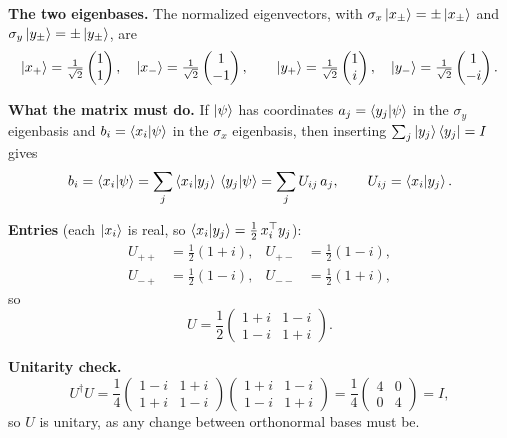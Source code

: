 \documentclass[a4paper, 10pt]{article}
\begin{document}
\begin{solution}
	\noindent \textbf{The two eigenbases.} The normalized eigenvectors, with \( \sigma_x\ket{x_\pm} = \pm\ket{x_\pm} \) and \( \sigma_y\ket{y_\pm} = \pm\ket{y_\pm} \), are
	\[
		\ket{x_+} = \tfrac{1}{\sqrt{2}}\begin{pmatrix} 1 \\ 1 \end{pmatrix}, \quad
		\ket{x_-} = \tfrac{1}{\sqrt{2}}\begin{pmatrix} 1 \\ -1 \end{pmatrix}, \qquad
		\ket{y_+} = \tfrac{1}{\sqrt{2}}\begin{pmatrix} 1 \\ i \end{pmatrix}, \quad
		\ket{y_-} = \tfrac{1}{\sqrt{2}}\begin{pmatrix} 1 \\ -i \end{pmatrix}.
	\]

	\noindent \textbf{What the matrix must do.} If \( \ket{\psi} \) has coordinates \( a_j = \braket{y_j \vert \psi} \) in the \( \sigma_y \) eigenbasis and \( b_i = \braket{x_i \vert \psi} \) in the \( \sigma_x \) eigenbasis, then inserting \( \sum_j \ket{y_j}\bra{y_j} = I \) gives
	\[
		b_i = \braket{x_i \vert \psi}
		= \sum_j \braket{x_i \vert y_j}\,\braket{y_j \vert \psi}
		= \sum_j U_{ij}\,a_j,
		\qquad U_{ij} = \braket{x_i \vert y_j}.
	\]

	\noindent \textbf{Entries} (each \( \ket{x_i} \) is real, so \( \braket{x_i \vert y_j} = \tfrac{1}{2}\,x_i^{\top} y_j \)):
	\begin{align*}
		U_{++} & = \tfrac{1}{2}(1 + i), & U_{+-} & = \tfrac{1}{2}(1 - i), \\
		U_{-+} & = \tfrac{1}{2}(1 - i), & U_{--} & = \tfrac{1}{2}(1 + i),
	\end{align*}
	so
	\[
		U = \frac{1}{2}\begin{pmatrix} 1 + i & 1 - i \\ 1 - i & 1 + i \end{pmatrix}.
	\]

	\noindent \textbf{Unitarity check.}
	\[
		U^{\dagger}U
		= \frac{1}{4}\begin{pmatrix} 1 - i & 1 + i \\ 1 + i & 1 - i \end{pmatrix}
		\begin{pmatrix} 1 + i & 1 - i \\ 1 - i & 1 + i \end{pmatrix}
		= \frac{1}{4}\begin{pmatrix} 4 & 0 \\ 0 & 4 \end{pmatrix}
		= I,
	\]
	so \( U \) is unitary, as any change between orthonormal bases must be.
\end{solution}
\end{document}
